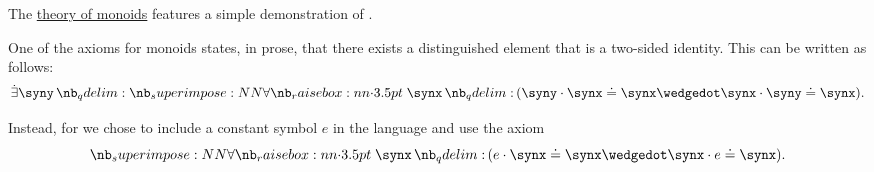 \begin{example}\label{ex:existential_quantifier_removal_monoids}
  The \hyperref[def:monoid/theory]{theory of monoids} features a simple demonstration of .

  One of the axioms for monoids states, in prose, that there exists a distinguished element that is a two-sided identity. This can be written as follows:
  \begin{equation*}
    \qexists \syny \qforall \synx (\syny \cdot \synx \syneq \synx \synwedge \synx \cdot \syny \syneq \synx).
  \end{equation*}

  Instead, for  we chose to include a constant symbol \( e \) in the language and use the axiom
  \begin{equation*}
    \qforall \synx (e \cdot \synx \syneq \synx \synwedge \synx \cdot e \syneq \synx).
  \end{equation*}
\end{example}


